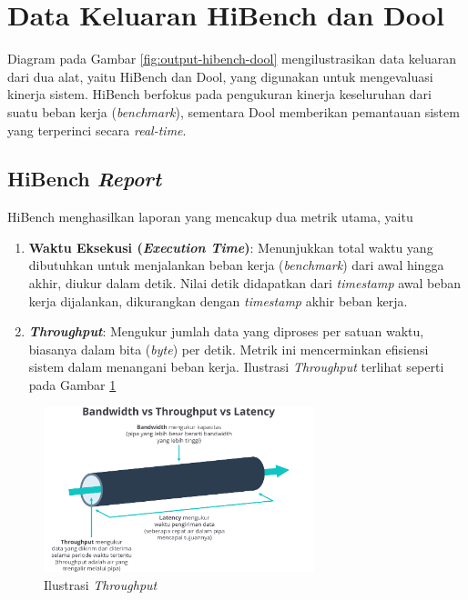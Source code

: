 \section{Data Keluaran HiBench dan Dool}
Diagram pada Gambar \ref{fig:output-hibench-dool} mengilustrasikan data keluaran dari dua alat, yaitu HiBench dan Dool, yang digunakan untuk mengevaluasi kinerja sistem. HiBench berfokus pada pengukuran kinerja keseluruhan dari suatu beban kerja (\textit{benchmark}), sementara Dool memberikan pemantauan sistem yang terperinci secara \textit{real-time}.

\subsection{HiBench \textit{Report}}
HiBench menghasilkan laporan yang mencakup dua metrik utama, yaitu
\begin{enumerate}
	\item \textbf{Waktu Eksekusi (\textit{Execution Time})}: Menunjukkan total waktu yang dibutuhkan untuk menjalankan beban kerja (\textit{benchmark}) dari awal hingga akhir, diukur dalam detik. Nilai detik didapatkan dari \textit{timestamp} awal beban kerja dijalankan, dikurangkan dengan \textit{timestamp} akhir beban kerja.
	\item \textbf{\textit{Throughput}}: Mengukur jumlah data yang diproses per satuan waktu, biasanya dalam bita (\textit{byte}) per detik. Metrik ini mencerminkan efisiensi sistem dalam menangani beban kerja. Ilustrasi \textit{Throughput} terlihat seperti pada Gambar \ref{fig:ilustrasi-throughput}
\end{enumerate}

\begin{figure}[h]
    \centering
    \includegraphics[width=0.7\textwidth]{figures/ch02/ilustrasi-lalu-lintas-jaringan.png}
    \caption{Ilustrasi \textit{Throughput} \cite{PenjelasanApaItu2023}}
    \label{fig:ilustrasi-throughput}
\end{figure}



